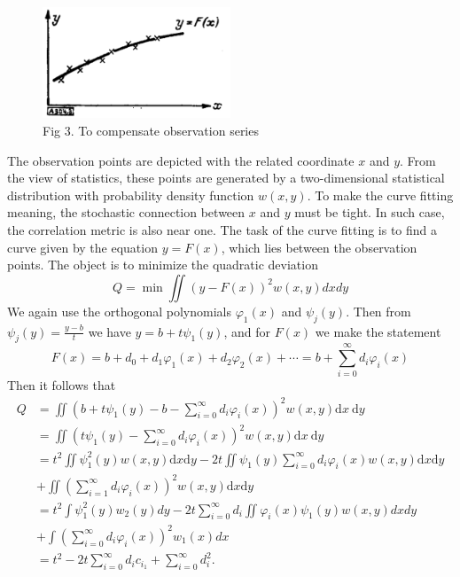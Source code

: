 \documentclass{article}
\begin{document}
\begin{figure}
\centering
\includegraphics[width=0.5\textwidth]{fig3.png}
\caption*{Fig 3. To compensate observation series}
\end{figure}
The observation points are depicted with the related coordinate $x$ and $y$.
From the view of statistics, these points are generated by a two-dimensional statistical
distribution with probability density function $w(x,y)$.
To make the curve fitting meaning, the stochastic connection between $x$ and $y$ must be tight. In such case, the correlation metric is also near one. The task of the curve
fitting is to find a curve given by the equation $y=F(x)$, which lies between the
observation points. The object is to minimize the quadratic deviation
\begin{equation}
    Q = \min \iint(y-F(x))^2 w(x,y) dxdy
\end{equation}
We again use the orthogonal polynomials $\varphi_1(x)$
and $\psi_j(y)$. Then from $\psi_j(y) = \frac{y-b}{t}$
we have $y=b+t\psi_1(y)$, and for $F(x)$ we make the statement
$$
F(x)=b+d_{0}+d_{1} \varphi_{1}(x)+d_{2} \varphi_{2}(x)+\cdots=b+\sum_{i=0}^{\infty} d_{i} \varphi_{i}(x)
$$
Then it follows that
\begin{align*}
Q &=\iint\left(b+t \psi_{1}(y)-b-\sum_{i=0}^{\infty} d_{i} \varphi_{i}(x)\right)^{2} w(x, y) \mathrm{d} x \mathrm{~d} y \\
&=\iint\left(t \psi_{1}(y)-\sum_{i=0}^{\infty} d_{i} \varphi_{i}(x)\right)^{2} w(x, y) \mathrm{d} x \mathrm{~d} y \\
&=t^{2} \iint\psi_{1}^{2}(y) w(x, y) \mathrm{d} x \mathrm{d} y-2 t\iint \psi_{1}(y) \sum_{i=0}^{\infty} d_{i} \varphi_{i}(x) w(x, y) \mathrm{d} x \mathrm{d} y \\
&+\iint\left(\sum_{i=1}^{\infty} d_{i} \varphi_{i}(x)\right)^{2} w(x, y) \mathrm{d} x \mathrm{d} y \\
&=t^{2} \int \psi_{1}^{2}(y) w_{2}(y) d y-2 t \sum_{i=0}^{\infty} d_{i} \iint \varphi_{i}(x) \psi_{1}(y) w(x, y) d x d y \\
&+\int\left(\sum_{i=0}^{\infty} d_{i} \varphi_{i}(x)\right)^{2} w_{1}(x) d x \\
&=t^{2}-2 t \sum_{i=0}^{\infty} d_{i} c_{i_{1}}+\sum_{i=0}^{\infty} d_{i}^{2}.
\end{align*}
\end{document}

